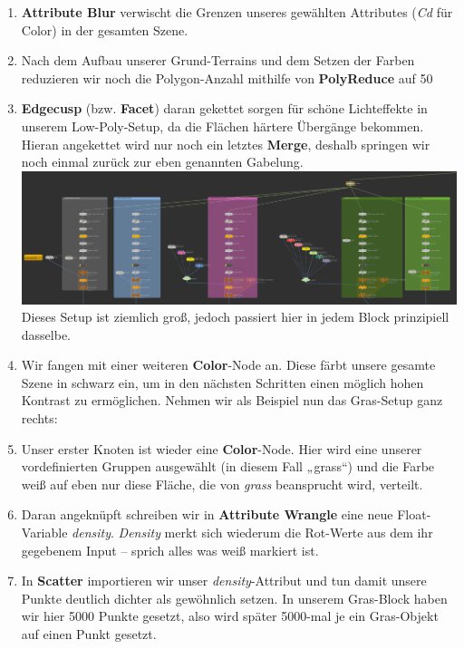 \documentclass[paper=a4,fontsize=12pt,ngerman]{scrartcl}
\begin{document}
\begin{enumerate}
\begin{minipage}{0.14\textwidth}
		\end{minipage}
		\item \textbf{Attribute Blur} verwischt die Grenzen unseres gewählten Attributes (\textit{Cd} für Color) in der gesamten Szene.
		\item Nach dem Aufbau unserer Grund-Terrains und dem Setzen der Farben reduzieren wir noch die Polygon-Anzahl mithilfe von \textbf{PolyReduce} auf 50%
		\item \textbf{Edgecusp} (bzw. \textbf{Facet}) daran gekettet sorgen für schöne Lichteffekte in unserem Low-Poly-Setup, da die Flächen härtere Übergänge bekommen.\\
		Hieran angekettet wird nur noch ein letztes \textbf{Merge}, deshalb springen wir noch einmal zurück zur eben genannten Gabelung.\\
		\includegraphics*[width=\textwidth]{graphics/Nedim29.png}\\
		Dieses Setup ist ziemlich groß, jedoch passiert hier in jedem Block prinzipiell dasselbe.
		\item Wir fangen mit einer weiteren \textbf{Color}-Node an. Diese färbt unsere gesamte Szene in schwarz ein, um in den nächsten Schritten einen möglich hohen Kontrast zu ermöglichen. Nehmen wir als Beispiel nun das Gras-Setup ganz rechts:
		\item Unser erster Knoten ist wieder eine \textbf{Color}-Node. Hier wird eine unserer vordefinierten Gruppen ausgewählt (in diesem Fall „grass“) und die Farbe weiß auf eben nur diese Fläche, die von \textit{grass} beansprucht wird, verteilt.
		\item Daran angeknüpft schreiben wir in \textbf{Attribute Wrangle} eine neue Float-Variable \textit{density}. \textit{Density} merkt sich wiederum die Rot-Werte aus dem ihr gegebenem Input – sprich alles was weiß markiert ist.
		\item In \textbf{Scatter} importieren wir unser \textit{density}-Attribut und tun damit unsere Punkte deutlich dichter als gewöhnlich setzen. In unserem Gras-Block haben wir hier 5000 Punkte gesetzt, also wird später 5000-mal je ein Gras-Objekt auf einen Punkt gesetzt.

\end{enumerate}
\end{document}
